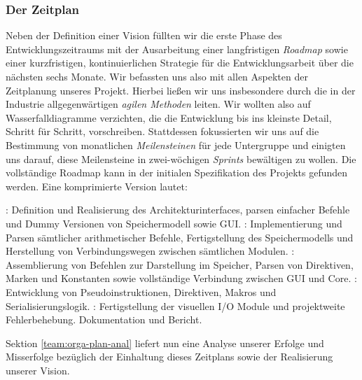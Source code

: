 
\subsubsection{Der Zeitplan}
\label{team:orga-plan-time}

Neben der Definition einer Vision füllten wir die erste Phase des
Entwicklungszeitraums mit der Ausarbeitung einer langfristigen \emph{Roadmap}
sowie einer kurzfristigen, kontinuierlichen Strategie für die Entwicklungsarbeit
über die nächsten sechs Monate. Wir befassten uns also mit allen Aspekten der
Zeitplanung unseres Projekt. Hierbei ließen wir uns insbesondere durch die in
der Industrie allgegenwärtigen \emph{agilen Methoden} leiten. Wir wollten also
auf Wasserfalldiagramme verzichten, die die Entwicklung bis ins kleinste Detail,
Schritt für Schritt, vorschreiben. Stattdessen fokussierten wir uns auf die
Bestimmung von monatlichen \emph{Meilensteinen} für jede Untergruppe und
einigten uns darauf, diese Meilensteine in zwei-wöchigen \emph{Sprints}
bewältigen zu wollen. Die vollständige Roadmap kann in der initialen
Spezifikation des Projekts gefunden werden. Eine komprimierte Version lautet:

\begin{itemize}
  : Definition und Realisierung des Architekturinterfaces, parsen einfacher Befehle und Dummy Versionen von Speichermodell sowie GUI.
  : Implementierung und Parsen sämtlicher arithmetischer Befehle, Fertigstellung des Speichermodells und Herstellung von Verbindungswegen zwischen sämtlichen Modulen.
  : Assemblierung von Befehlen zur Darstellung im Speicher, Parsen von Direktiven, Marken und Konstanten sowie vollständige Verbindung zwischen GUI und Core.
  : Entwicklung von Pseudoinstruktionen, Direktiven, Makros und Serialisierungslogik.
  : Fertigstellung der visuellen I/O Module und projektweite Fehlerbehebung.
   Dokumentation und Bericht.
\end{itemize}

Sektion \ref{team:orga-plan-anal} liefert nun eine Analyse unserer Erfolge und Misserfolge bezüglich der Einhaltung dieses Zeitplans sowie der Realisierung unserer Vision.
